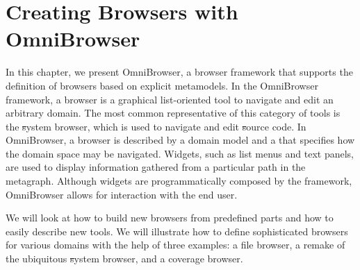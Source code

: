 \documentclass[a4paper,10pt,twoside]{book}
\begin{document}
	\renewcommand{\nnbb}[2]{} %
	\sloppy
\fi

\newcommand{\ob}{Omni\-Brow\-ser\xspace}
\newcommand{\obf}{Omni\-Brow\-ser framework\xspace}
\newcommand{\applflab}{ApplFLab\xspace}


\chapter{Creating Browsers with OmniBrowser}



\noindent
In this chapter, we present \ob, a browser framework that supports the definition of browsers based on explicit metamodels. In the \obf, a browser is a graphical list-oriented tool to navigate and edit an arbitrary domain. The most common representative of this category of tools is the \st system browser, which is used to navigate and edit \st source code.
In \ob, a browser is described by a domain model and a  that specifies how the domain space may be navigated. Widgets, such as list menus and text panels, are used to display information gathered from a particular path in the metagraph. Although widgets are programmatically composed by the framework, \ob allows for interaction with the end user.
\indexmain{\ob}


We will look at how to build new browsers from predefined parts and how to easily describe new tools. We will illustrate how to define sophisticated browsers for various domains with the help of three examples: a file browser, a remake of the ubiquitous \st system browser, and a coverage browser.

\end{document}
